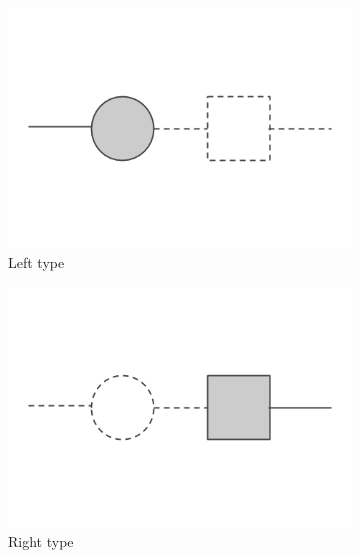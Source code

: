 \documentclass[11pt,oneside]{amsart}
\begin{document}
\begin{figure}[ht]
\centering
\captionsetup[subfigure]{justification=centering}
    \begin{subfigure}{.3\textwidth}
        \centering
        \includegraphics[width=\linewidth]{Left_type.png} 
        \caption{Left type} 
    \end{subfigure} %
    \begin{subfigure}{.3\textwidth}
        \centering
        \includegraphics[width=\linewidth]{Right_type.png}
        \caption{Right type}
    \end{subfigure} 
    \begin{subfigure}{.3\textwidth}
        \centering

\end{subfigure}
\end{figure}
\end{document}
